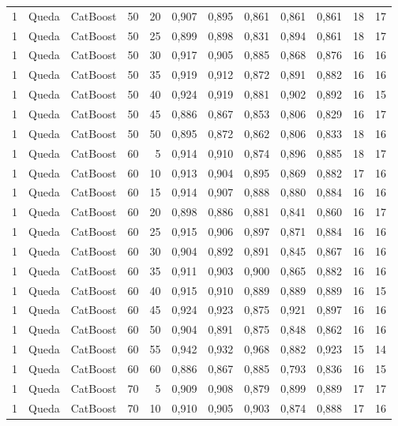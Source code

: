\begin{longtable}{@{}rllrrrrrrrrr@{}}
1 & Queda & CatBoost & 50 & 20 & 0,907 & 0,895 & 0,861 & 0,861 & 0,861 & 18 & 17 \\
1 & Queda & CatBoost & 50 & 25 & 0,899 & 0,898 & 0,831 & 0,894 & 0,861 & 18 & 17 \\
1 & Queda & CatBoost & 50 & 30 & 0,917 & 0,905 & 0,885 & 0,868 & 0,876 & 16 & 16 \\
1 & Queda & CatBoost & 50 & 35 & 0,919 & 0,912 & 0,872 & 0,891 & 0,882 & 16 & 16 \\
1 & Queda & CatBoost & 50 & 40 & 0,924 & 0,919 & 0,881 & 0,902 & 0,892 & 16 & 15 \\
1 & Queda & CatBoost & 50 & 45 & 0,886 & 0,867 & 0,853 & 0,806 & 0,829 & 16 & 17 \\
1 & Queda & CatBoost & 50 & 50 & 0,895 & 0,872 & 0,862 & 0,806 & 0,833 & 18 & 16 \\
1 & Queda & CatBoost & 60 & 5 & 0,914 & 0,910 & 0,874 & 0,896 & 0,885 & 18 & 17 \\
1 & Queda & CatBoost & 60 & 10 & 0,913 & 0,904 & 0,895 & 0,869 & 0,882 & 17 & 16 \\
1 & Queda & CatBoost & 60 & 15 & 0,914 & 0,907 & 0,888 & 0,880 & 0,884 & 16 & 16 \\
1 & Queda & CatBoost & 60 & 20 & 0,898 & 0,886 & 0,881 & 0,841 & 0,860 & 16 & 17 \\
1 & Queda & CatBoost & 60 & 25 & 0,915 & 0,906 & 0,897 & 0,871 & 0,884 & 16 & 16 \\
1 & Queda & CatBoost & 60 & 30 & 0,904 & 0,892 & 0,891 & 0,845 & 0,867 & 16 & 16 \\
1 & Queda & CatBoost & 60 & 35 & 0,911 & 0,903 & 0,900 & 0,865 & 0,882 & 16 & 16 \\
1 & Queda & CatBoost & 60 & 40 & 0,915 & 0,910 & 0,889 & 0,889 & 0,889 & 16 & 15 \\
1 & Queda & CatBoost & 60 & 45 & 0,924 & 0,923 & 0,875 & 0,921 & 0,897 & 16 & 16 \\
1 & Queda & CatBoost & 60 & 50 & 0,904 & 0,891 & 0,875 & 0,848 & 0,862 & 16 & 16 \\
1 & Queda & CatBoost & 60 & 55 & 0,942 & 0,932 & 0,968 & 0,882 & 0,923 & 15 & 14 \\
1 & Queda & CatBoost & 60 & 60 & 0,886 & 0,867 & 0,885 & 0,793 & 0,836 & 16 & 15 \\
1 & Queda & CatBoost & 70 & 5 & 0,909 & 0,908 & 0,879 & 0,899 & 0,889 & 17 & 17 \\
1 & Queda & CatBoost & 70 & 10 & 0,910 & 0,905 & 0,903 & 0,874 & 0,888 & 17 & 16 \\

\end{longtable}
